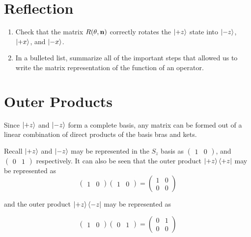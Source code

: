 \documentclass{article}
\begin{document}
\section{Reflection}
    \begin{enumerate}[label=(\alph*)]
      \item Check that the matrix $R(\theta,\vb{n})$ correctly rotates the $\ket{+z}$ state into $\ket{-z}$, $\ket{+x}$, and $\ket{-x}$.
      \vspace{6cm}
      \item In a bulleted list, summarize all of the important steps that allowed us to write the matrix representation of the function of an operator.
  \end{enumerate}
    \newpage
 \section{Outer Products}
    
    \noindent
      Since $\ket{+z}$ and $\ket{-z}$ form a complete basis, any matrix can be formed out of a linear combination of direct products of the basis bras and kets.\newline
      
      Recall $\ket{+z}$ and $\ket{-z}$ may be represented in the $S_{z}$ basis as 
$\left(\begin{array}{c}1 & 0 \end{array}\right)$, and $ \left(\begin{array}{c}0 & 1 \end{array}\right)$ respectively.  It can also be seen that the outer product $\ket{+z}\bra{+z}$ may be represented as 
\begin{equation}
\left(\begin{array}{c}1 & 0 \end{array}\right)\left(\begin{array}{cccc}1 & 0  \end{array}\right) = \left(\begin{array}{cccc}1 & 0  \\ 0 & 0 \end{array}\right)
\end{equation}

and the outer product $\ket{+z}\bra{-z}$ may be represented as 

\begin{equation}
\left(\begin{array}{c}1 & 0 \end{array}\right)\left(\begin{array}{cccc}0 & 1  \end{array}\right) = \left(\begin{array}{cccc}0 & 1  \\ 0 & 0 \end{array}\right)
\end{equation}
\end{document}
